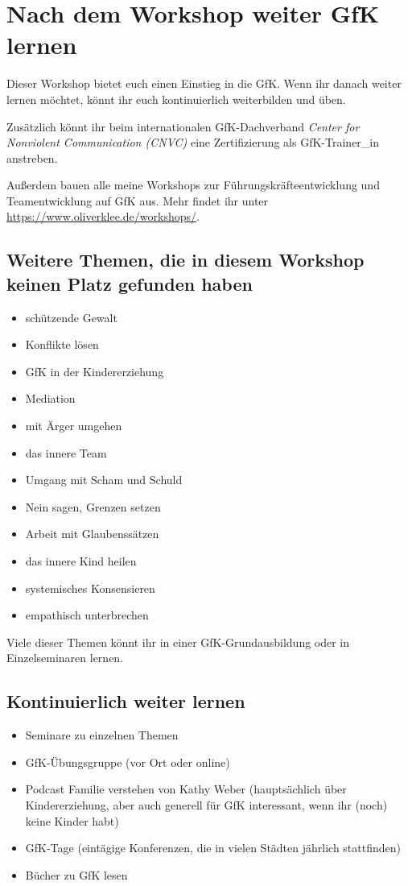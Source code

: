 \section{Nach dem Workshop weiter GfK lernen}
\label{gfk-weiterlenen}

Dieser Workshop bietet euch einen Einstieg in die GfK. Wenn ihr danach weiter lernen möchtet, könnt ihr euch kontinuierlich weiterbilden und üben.

Zusätzlich könnt ihr beim internationalen GfK-Dachverband \emph{Center for Nonviolent Communication (CNVC)} eine Zertifizierung als GfK-Trainer\_in anstreben.

Außerdem bauen alle meine Workshops zur Führungskräfteentwicklung und Teamentwicklung auf GfK aus. Mehr findet ihr unter \url{https://www.oliverklee.de/workshops/}.


\subsection{Weitere Themen, die in diesem Workshop keinen Platz gefunden haben}

\begin{itemize}
  \item schützende Gewalt
  \item Konflikte lösen
  \item GfK in der Kindererziehung
  \item Mediation
  \item mit Ärger umgehen
  \item das innere Team
  \item Umgang mit Scham und Schuld
  \item Nein sagen, Grenzen setzen
  \item Arbeit mit Glaubenssätzen
  \item das innere Kind heilen
  \item systemisches Konsensieren
  \item empathisch unterbrechen
\end{itemize}

Viele dieser Themen könnt ihr in einer GfK-Grundausbildung oder in Einzelseminaren lernen.


\subsection{Kontinuierlich weiter lernen}

\begin{itemize}
  \item Seminare zu einzelnen Themen
  \item GfK-Übungsgruppe (vor Ort oder online)
  \item Podcast \glqq Familie verstehen\grqq\cite{familie-verstehen-podcast} von Kathy Weber (hauptsächlich über Kindererziehung, aber auch generell für GfK interessant, wenn ihr (noch) keine Kinder habt)
  \item GfK-Tage (eintägige Konferenzen, die in vielen Städten jährlich stattfinden)
  \item Bücher zu GfK lesen
\end{itemize}

